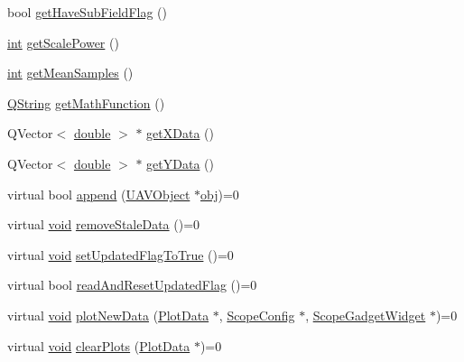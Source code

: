\begin{DoxyCompactItemize}
\item 
bool \hyperlink{group___scope_plugin_gaac624ceed7580c679cbbb43c46881718}{get\-Have\-Sub\-Field\-Flag} ()
\item 
\hyperlink{ioapi_8h_a787fa3cf048117ba7123753c1e74fcd6}{int} \hyperlink{group___scope_plugin_ga598d81218b7c2912d88b61e5b1e9d342}{get\-Scale\-Power} ()
\item 
\hyperlink{ioapi_8h_a787fa3cf048117ba7123753c1e74fcd6}{int} \hyperlink{group___scope_plugin_ga21623188dbae082bf46f247209363664}{get\-Mean\-Samples} ()
\item 
\hyperlink{group___u_a_v_objects_plugin_gab9d252f49c333c94a72f97ce3105a32d}{Q\-String} \hyperlink{group___scope_plugin_ga22e23fa455628102d53af51bb4ff4a62}{get\-Math\-Function} ()
\item 
Q\-Vector$<$ \hyperlink{_super_l_u_support_8h_a8956b2b9f49bf918deed98379d159ca7}{double} $>$ $\ast$ \hyperlink{group___scope_plugin_gaadbf87fb25ba73a5079d44e88f357cd9}{get\-X\-Data} ()
\item 
Q\-Vector$<$ \hyperlink{_super_l_u_support_8h_a8956b2b9f49bf918deed98379d159ca7}{double} $>$ $\ast$ \hyperlink{group___scope_plugin_gac891ccbeaba7cca3cc03233f4ecd0cda}{get\-Y\-Data} ()
\item 
virtual bool \hyperlink{group___scope_plugin_ga5b3222f1966c12cc3dbbfe79f80f49e8}{append} (\hyperlink{class_u_a_v_object}{U\-A\-V\-Object} $\ast$\hyperlink{glext_8h_a0c0d4701a6c89f4f7f0640715d27ab26}{obj})=0
\item 
virtual \hyperlink{group___u_a_v_objects_plugin_ga444cf2ff3f0ecbe028adce838d373f5c}{void} \hyperlink{group___scope_plugin_gaa72c7c3b2933a5f313be52020c003990}{remove\-Stale\-Data} ()=0
\item 
virtual \hyperlink{group___u_a_v_objects_plugin_ga444cf2ff3f0ecbe028adce838d373f5c}{void} \hyperlink{group___scope_plugin_ga9c8859638969e941f2e71d57b9454c37}{set\-Updated\-Flag\-To\-True} ()=0
\item 
virtual bool \hyperlink{group___scope_plugin_ga18a9ab6db2aa09b675a0ede1e0bfddc6}{read\-And\-Reset\-Updated\-Flag} ()=0
\item 
virtual \hyperlink{group___u_a_v_objects_plugin_ga444cf2ff3f0ecbe028adce838d373f5c}{void} \hyperlink{group___scope_plugin_ga804704f7eaf4186938e8d1163a9d410c}{plot\-New\-Data} (\hyperlink{class_plot_data}{Plot\-Data} $\ast$, \hyperlink{class_scope_config}{Scope\-Config} $\ast$, \hyperlink{class_scope_gadget_widget}{Scope\-Gadget\-Widget} $\ast$)=0
\item 
virtual \hyperlink{group___u_a_v_objects_plugin_ga444cf2ff3f0ecbe028adce838d373f5c}{void} \hyperlink{group___scope_plugin_ga69868354ebe2ca7e39c8663d547c5935}{clear\-Plots} (\hyperlink{class_plot_data}{Plot\-Data} $\ast$)=0
\end{DoxyCompactItemize}
